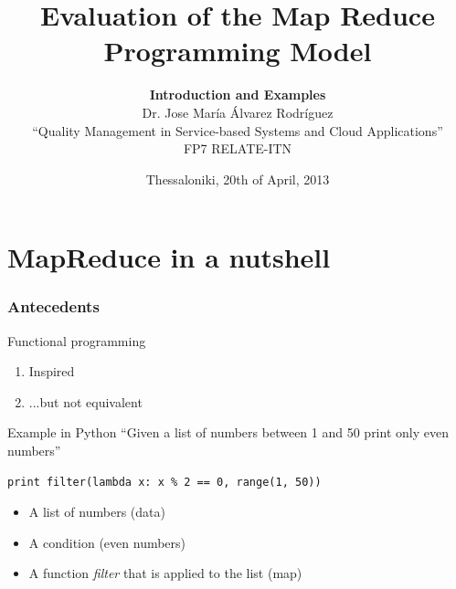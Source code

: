 \documentclass[xcolor=dvipsnames,dvip,notes=show,table]{beamer}
\title[MapReduce Intro]{Evaluation of the Map Reduce Programming Model}
\author[Dr. Jose María Álvarez Rodríguez]{\textbf{Introduction and Examples}\\ \vspace{0.3cm} Dr. Jose María Álvarez Rodríguez \\ \vspace{0.3cm} ``Quality Management in Service-based Systems and Cloud Applications'' \\ \vspace{0.3cm} FP7 RELATE-ITN}
\subtitle{}
\institute{South East European Research Center}
\date{Thessaloniki, 20th of April, 2013}
\begin{document}
\frame{
\titlepage

}

\frame{
\tableofcontents

}


\section{MapReduce in a nutshell}




\begin{frame}[fragile]
  \frametitle{Antecedents}

\begin{alertblock}{Functional programming}
\begin{enumerate}
 \item Inspired
 \item ...but not equivalent
\end{enumerate}
\end{alertblock}

\begin{exampleblock}{Example in Python}
``Given a list of numbers between 1 and 50 print only even numbers''
\begin{lstlisting}
print filter(lambda x: x % 2 == 0, range(1, 50))
\end{lstlisting}
\end{exampleblock}
\begin{itemize}
 \item A list of numbers (data)
 \item A condition (even numbers)
 \item A function \textit{filter} that is applied to the list (map)
\end{itemize}


\end{frame}
\end{document}
